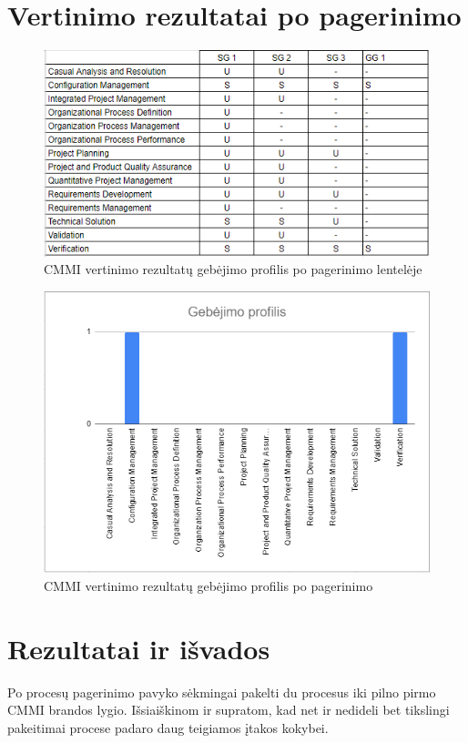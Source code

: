 \documentclass{VUMIFPSkursinis}
\begin{document}
	\section{Vertinimo rezultatai po pagerinimo}
	\begin{figure}[!htbp]
		\includegraphics[scale=0.9]{img/poPataisymo}
		\caption{CMMI vertinimo rezultatų gebėjimo profilis po pagerinimo lentelėje} %
		\label{img:ProfilisPo}
	\end{figure}
	\begin{figure}[!htbp]
		\includegraphics[scale=0.8]{img/poPataisymoProfilis}
		\caption{CMMI vertinimo rezultatų gebėjimo profilis po pagerinimo} %
		\label{img:ProfilisPo}
	\end{figure}
\section{Rezultatai ir išvados}
Po procesų pagerinimo pavyko sėkmingai pakelti du procesus iki pilno pirmo CMMI brandos
lygio. Išsiaiškinom ir supratom, kad net ir nedideli bet tikslingi pakeitimai procese padaro daug
teigiamos įtakos kokybei.
\end{document}

